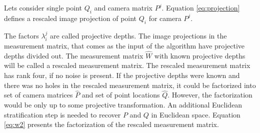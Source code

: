 \documentclass[12pt]{article}
\begin{document}

Lets consider single point $Q_i$ and camera matrix $P^j$. Equation \ref{eq:projection} defines a rescaled image projection of point $Q_i$ for camera $P^j$.


The factors $\lambda_i^j$ are called projective depths. The image projections in the measurement matrix, that comes as the input of the algorithm have projective depths divided out. The measurement matrix $\hat{W}$ with known projective depths will be called a rescaled measurement matrix. The rescaled measurement matrix has rank four, if no noise is present. If the projective depths were known and there was no holes in the rescaled measurement matrix, it could be factorized into set of camera matrices $\hat{P}$ and set of point locations $\hat{Q}$. However, the factorization would be only up to some projective transformation. An additional Euclidean stratification step is needed to recover $P$ and $Q$ in Euclidean space. Equation \ref{eq:w2} presents the factorization of the rescaled measurement matrix.
\end{document}
